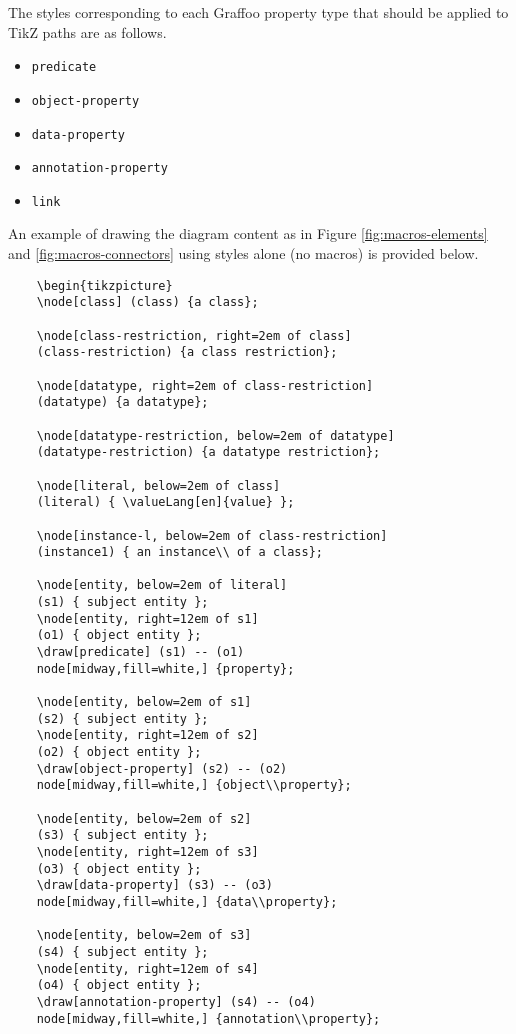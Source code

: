 \documentclass[11pt,a4paper,final,oneside,onecolumn]{article}
\begin{document}
	The styles corresponding to each Graffoo property type that should be applied to TikZ paths are as follows.
	
	\begin{itemize}
		\item \texttt{predicate}
		\item \texttt{object-property}
		\item \texttt{data-property}
		\item \texttt{annotation-property}
		\item \texttt{link}	
	\end{itemize}
	
	An example of drawing the diagram content as in Figure \ref{fig:macros-elements} and \ref{fig:macros-connectors} using styles alone (no macros) is provided below. 
	
	\begin{verbatim}
	\begin{tikzpicture}
	\node[class] (class) {a class};
	
	\node[class-restriction, right=2em of class]
	(class-restriction) {a class restriction};
	
	\node[datatype, right=2em of class-restriction]
	(datatype) {a datatype};
	
	\node[datatype-restriction, below=2em of datatype]
	(datatype-restriction) {a datatype restriction};
	
	\node[literal, below=2em of class]
	(literal) { \valueLang[en]{value} };	
	
	\node[instance-l, below=2em of class-restriction]
	(instance1) { an instance\\ of a class};
	
	\node[entity, below=2em of literal]
	(s1) { subject entity };	
	\node[entity, right=12em of s1]
	(o1) { object entity };	
	\draw[predicate] (s1) -- (o1)
	node[midway,fill=white,] {property};
	
	\node[entity, below=2em of s1]
	(s2) { subject entity };
	\node[entity, right=12em of s2]
	(o2) { object entity };
	\draw[object-property] (s2) -- (o2)
	node[midway,fill=white,] {object\\property};
	
	\node[entity, below=2em of s2]
	(s3) { subject entity };
	\node[entity, right=12em of s3]
	(o3) { object entity };
	\draw[data-property] (s3) -- (o3)
	node[midway,fill=white,] {data\\property};
	
	\node[entity, below=2em of s3]
	(s4) { subject entity };
	\node[entity, right=12em of s4]
	(o4) { object entity };
	\draw[annotation-property] (s4) -- (o4)
	node[midway,fill=white,] {annotation\\property};
	

\end{verbatim}
\end{document}
